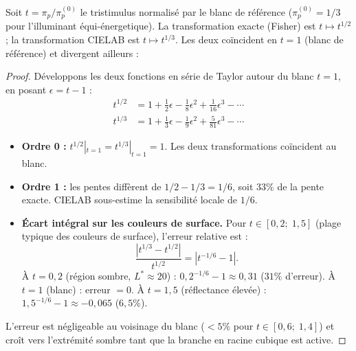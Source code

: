 \documentclass[12pt,a4paper]{article}
\begin{document}
\begin{derivedbox}
Soit $t = \pi_p / \pi_p^{(0)}$ le tristimulus normalis\'e par le blanc
de r\'ef\'erence ($\pi_p^{(0)} = 1/3$ pour l'illuminant \'equi-\'energetique).
La transformation exacte (Fisher) est $t \mapsto t^{1/2}$ ; la
transformation CIELAB est $t \mapsto t^{1/3}$. Les deux co\"incident en
$t = 1$ (blanc de r\'ef\'erence) et divergent ailleurs :

\begin{proof}
D\'eveloppons les deux fonctions en s\'erie de Taylor autour du blanc
$t = 1$, en posant $\epsilon = t - 1$ :
\begin{align}
  t^{1/2} &= 1 + \tfrac{1}{2}\epsilon - \tfrac{1}{8}\epsilon^2
    + \tfrac{1}{16}\epsilon^3 - \cdots \tag{Fisher exact} \\
  t^{1/3} &= 1 + \tfrac{1}{3}\epsilon - \tfrac{1}{9}\epsilon^2
    + \tfrac{5}{81}\epsilon^3 - \cdots \tag{CIELAB}
\end{align}
\begin{itemize}[nosep]
\item \textbf{Ordre 0 :} $t^{1/2}|_{t=1} = t^{1/3}|_{t=1} = 1$. Les
  deux transformations co\"incident au blanc.
\item \textbf{Ordre 1 :} les pentes diff\`erent de $1/2 - 1/3 = 1/6$,
  soit $33\%$ de la pente exacte. CIELAB sous-estime la sensibilit\'e
  locale de $1/6$.
\item \textbf{\'Ecart int\'egral sur les couleurs de surface.}
  Pour $t \in [0{,}2;\; 1{,}5]$ (plage typique des couleurs de
  surface), l'erreur relative est :
  \[
    \frac{|t^{1/3} - t^{1/2}|}{t^{1/2}}
    = |t^{-1/6} - 1|.
  \]
  \`A $t = 0{,}2$ (r\'egion sombre, $L^* \approx 20$) :
  $0{,}2^{-1/6} - 1 \approx 0{,}31$ ($31\%$ d'erreur).
  \`A $t = 1$ (blanc) : erreur $= 0$.
  \`A $t = 1{,}5$ (r\'eflectance \'elev\'ee) :
  $1{,}5^{-1/6} - 1 \approx -0{,}065$ ($6{,}5\%$).
\end{itemize}
L'erreur est n\'egligeable au voisinage du blanc ($< 5\%$ pour
$t \in [0{,}6;\; 1{,}4]$) et cro\^it vers l'extr\'emit\'e sombre tant
que la branche en racine cubique est active.
\end{proof}
\end{derivedbox}
\end{document}
